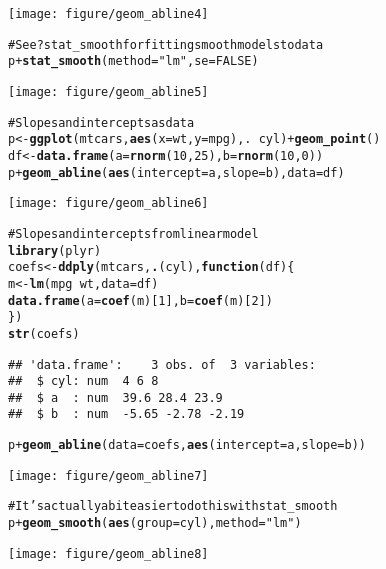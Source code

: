 \documentclass[a4paper,titlepage]{tufte-handout}\usepackage{graphicx, color}
\makeatletter
\def\maxwidth{ %
  \ifdim\Gin@nat@width>\linewidth
    \linewidth
  \else
    \Gin@nat@width
  \fi
}
\newcommand{\hlfunctioncall}[1]{\textcolor[rgb]{0.501960784313725,0,0.329411764705882}{\textbf{#1}}}%
\newcommand{\hlstring}[1]{\textcolor[rgb]{0.6,0.6,1}{#1}}%
\newcommand{\hlcomment}[1]{\textcolor[rgb]{0.180392156862745,0.6,0.341176470588235}{#1}}%
\newenvironment{kframe}{%
 \def\at@end@of@kframe{}%
 \ifinner\ifhmode%
  \def\at@end@of@kframe{\end{minipage}}%
  \begin{minipage}{\columnwidth}%
 \fi\fi%
 \def\FrameCommand##1{\hskip\@totalleftmargin \hskip-\fboxsep
 \colorbox{shadecolor}{##1}\hskip-\fboxsep
     \hskip-\linewidth \hskip-\@totalleftmargin \hskip\columnwidth}%
 \MakeFramed {\advance\hsize-\width
   \@totalleftmargin\z@ \linewidth\hsize
   \@setminipage}}%
 {\par\unskip\endMakeFramed%
 \at@end@of@kframe}
\newenvironment{knitrout}{}{} %
\makeatother
\begin{document}
\begin{knitrout}
\begin{kframe}
\end{kframe}\texttt{[image: figure/geom\_abline4]} \begin{kframe}\begin{alltt}
\hlcomment{# See ?stat_smooth for fitting smooth models to data}
p + \hlfunctioncall{stat_smooth}(method=\hlstring{"lm"}, se=FALSE)
\end{alltt}
\end{kframe}\texttt{[image: figure/geom\_abline5]} \begin{kframe}\begin{alltt}
\hlcomment{# Slopes and intercepts as data}
p <- \hlfunctioncall{ggplot}(mtcars, \hlfunctioncall{aes}(x = wt, y=mpg), . ~ cyl) + \hlfunctioncall{geom_point}()
df <- \hlfunctioncall{data.frame}(a=\hlfunctioncall{rnorm}(10, 25), b=\hlfunctioncall{rnorm}(10, 0))
p + \hlfunctioncall{geom_abline}(\hlfunctioncall{aes}(intercept=a, slope=b), data=df)
\end{alltt}
\end{kframe}\texttt{[image: figure/geom\_abline6]} \begin{kframe}\begin{alltt}
\hlcomment{# Slopes and intercepts from linear model}
\hlfunctioncall{library}(plyr)
coefs <- \hlfunctioncall{ddply}(mtcars, \hlfunctioncall{.}(cyl), \hlfunctioncall{function}(df) \{
  m <- \hlfunctioncall{lm}(mpg ~ wt, data=df)
  \hlfunctioncall{data.frame}(a = \hlfunctioncall{coef}(m)[1], b = \hlfunctioncall{coef}(m)[2])
\})
\hlfunctioncall{str}(coefs)
\end{alltt}
\begin{verbatim}
## 'data.frame':	3 obs. of  3 variables:
##  $ cyl: num  4 6 8
##  $ a  : num  39.6 28.4 23.9
##  $ b  : num  -5.65 -2.78 -2.19
\end{verbatim}
\begin{alltt}
p + \hlfunctioncall{geom_abline}(data=coefs, \hlfunctioncall{aes}(intercept=a, slope=b))
\end{alltt}
\end{kframe}\texttt{[image: figure/geom\_abline7]} \begin{kframe}\begin{alltt}
\hlcomment{# It's actually a bit easier to do this with stat_smooth}
p + \hlfunctioncall{geom_smooth}(\hlfunctioncall{aes}(group=cyl), method=\hlstring{"lm"})
\end{alltt}
\end{kframe}\texttt{[image: figure/geom\_abline8]} \begin{kframe}\begin{alltt}

\end{alltt}
\end{kframe}
\end{knitrout}
\end{document}
